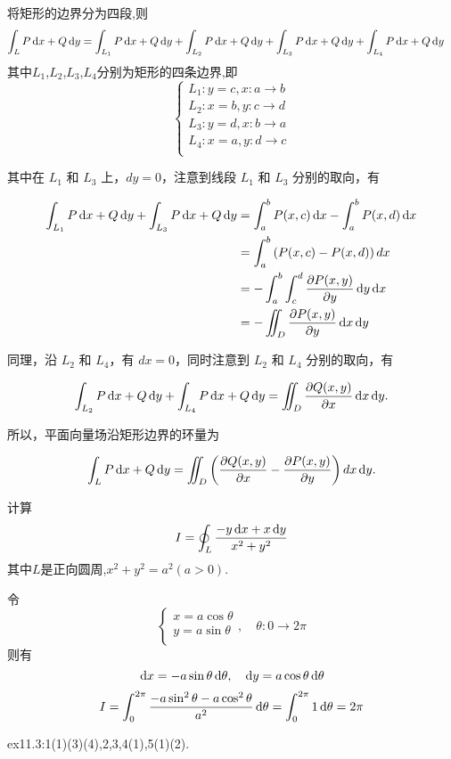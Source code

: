 \begin{solution}
    将矩形的边界分为四段,则
    \begin{align*}
        \int_L P \dif x + Q \dif y &= \int_{L_1} P \dif x + Q \dif y + \int_{L_2} P \dif x + Q \dif y + \int_{L_3} P \dif x + Q \dif y + \int_{L_4} P \dif x + Q \dif y
    \end{align*}
    其中$L_1$,$L_2$,$L_3$,$L_4$分别为矩形的四条边界,即
    $$\begin{cases}
        L_1: y = c , x : a \to b\\
        L_2: x = b, y: c \to d\\
        L_3: y = d, x : b \to a\\
        L_4: x = a, y : d \to c\\
    \end{cases}$$

    其中在 $L_1$ 和 $L_3$ 上，$dy = 0$，注意到线段 $L_1$ 和 $L_3$ 分别的取向，有

\begin{align*}
\int_{L_1} P \dif x + Q \dif y + \int_{L_3} P \dif x + Q \dif y 
&= \int_a^b P(x, c) \dif x - \int_a^b P(x, d) \dif x \\
&= \int_a^b \left(P(x, c) - P(x, d)\right) dx \\
&= - \int_a^b \int_c^d \frac{\partial P(x, y)}{\partial y}  \dif y \dif x \\
&= - \iint_D \frac{\partial P(x, y)}{\partial y}  \dif x \dif y
\end{align*}

同理，沿 $L_2$ 和 $L_4$，有 $dx = 0$，同时注意到 $L_2$ 和 $L_4$ 分别的取向，有

\begin{align*}
\int_{L_2} P \operatorname{d\!} x + Q \operatorname{d\!} y + \int_{L_4} P \operatorname{d\!} x + Q \operatorname{d\!} y 
= \iint_D \frac{\partial Q(x, y)}{\partial x}  \operatorname{d\!} x \operatorname{d\!} y.
\end{align*}

所以，平面向量场沿矩形边界的环量为

\[
\int_L P \operatorname{d\!} x + Q \operatorname{d\!} y = \iint_D \left( \frac{\partial Q(x, y)}{\partial x} - \frac{\partial P(x, y)}{\partial y} \right) dx \operatorname{d\!} y.
\]
\end{solution}

\begin{example}
    计算$$I = \oint_L \frac{-y \operatorname{d\!} x + x \operatorname{d\!} y}{x^2 + y^2}$$
    其中$L$是正向圆周,$x^2 + y^2 = a^2(a > 0)$.
\end{example}

\begin{solution}
    令$$\begin{cases}
        x = a \cos \theta\\
        y = a \sin \theta\\
    \end{cases}, \quad \theta : 0 \to 2\pi$$
    则有$$\operatorname{d\!} x = -a \sin \theta \operatorname{d\!} \theta, \quad \operatorname{d\!} y = a \cos \theta \operatorname{d\!} \theta$$
    $$I = \int_0^{2\pi} \frac{-a \sin^2 \theta - a \cos^2 \theta}{a^2} \operatorname{d\!} \theta = \int_0^{2\pi} 1 \operatorname{d\!} \theta = 2\pi$$
\end{solution}

\begin{homework}
    ex11.3:1(1)(3)(4),2,3,4(1),5(1)(2).
\end{homework}




